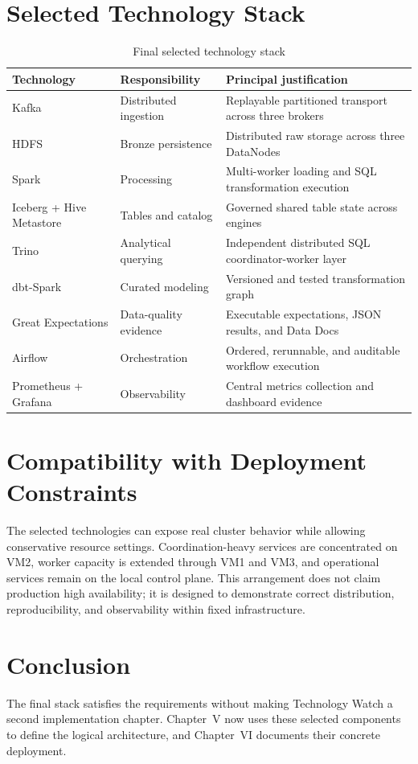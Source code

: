 \section{Selected Technology Stack}
\begin{table}[htbp]
    \centering
    \small
    \begin{tabularx}{\textwidth}{|>{\RaggedRight\arraybackslash}p{}|>{\RaggedRight\arraybackslash}p{}|>{\RaggedRight\arraybackslash}X|}
        \hline
        \rowcolor{ModernTableHeader}
        \color{white}\textbf{Technology} & \color{white}\textbf{Responsibility} & \color{white}\textbf{Principal justification} \\
        \hline
        Kafka & Distributed ingestion & Replayable partitioned transport across three brokers \\
        \hline
        HDFS & Bronze persistence & Distributed raw storage across three DataNodes \\
        \hline
        Spark & Processing & Multi-worker loading and SQL transformation execution \\
        \hline
        Iceberg + Hive Metastore & Tables and catalog & Governed shared table state across engines \\
        \hline
        Trino & Analytical querying & Independent distributed SQL coordinator-worker layer \\
        \hline
        dbt-Spark & Curated modeling & Versioned and tested transformation graph \\
        \hline
        Great Expectations & Data-quality evidence & Executable expectations, JSON results, and Data Docs \\
        \hline
        Airflow & Orchestration & Ordered, rerunnable, and auditable workflow execution \\
        \hline
        Prometheus + Grafana & Observability & Central metrics collection and dashboard evidence \\
        \hline
    \end{tabularx}
    \caption{Final selected technology stack}
    \label{tab:tech-final-stack}
\end{table}

\section{Compatibility with Deployment Constraints}
The selected technologies can expose real cluster behavior while allowing conservative resource settings. Coordination-heavy services are concentrated on VM2, worker capacity is extended through VM1 and VM3, and operational services remain on the local control plane. This arrangement does not claim production high availability; it is designed to demonstrate correct distribution, reproducibility, and observability within fixed infrastructure.

\section{Conclusion}
The final stack satisfies the requirements without making Technology Watch a second implementation chapter. Chapter~V now uses these selected components to define the logical architecture, and Chapter~VI documents their concrete deployment.